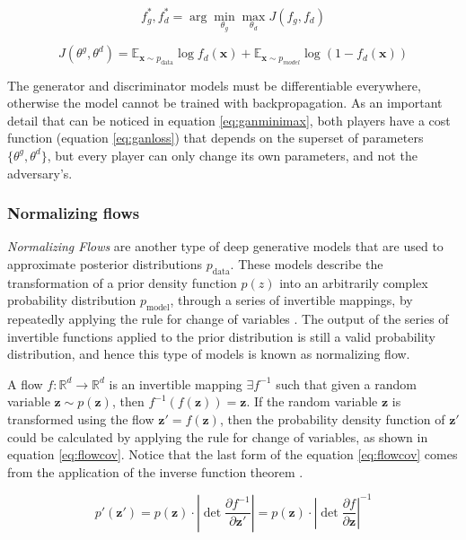 \begin{equation}
	\label{eq:ganminimax}
	f_g^*, f_d^* = \arg \min_{\theta_g} \max_{\theta_d} J(f_g, f_d)
\end{equation}

\begin{equation}
	\label{eq:ganloss}
	J(\theta^g, \theta^d) = \mathbb{E}_{\mathbf{x}\sim p_\mathrm{data}} \log f_d(\mathbf{x}) + \mathbb{E}_{\mathbf{x}\sim p_{model}} \log (1 - f_d(\mathbf{x}))
\end{equation}

The generator and discriminator models must be differentiable everywhere, otherwise the model cannot be trained with backpropagation. As an important detail that can be noticed in equation \ref{eq:ganminimax}, both players have a cost function (equation \ref{eq:ganloss}) that depends on the superset  of parameters $\{\theta^g, \theta^d\}$, but every player can only change its own parameters, and not the adversary's.



\subsubsection{Normalizing flows}
\textit{Normalizing Flows} are another type of deep generative models that are used to approximate posterior distributions $p_\mathrm{data}$. These models describe the transformation of a prior density function $p(z)$ into an arbitrarily complex probability distribution $p_\mathrm{model}$, through a series of invertible mappings, by repeatedly applying the rule for change of variables \autocite{rezende2015}. The output of the series of invertible functions applied to the prior distribution is still a valid probability distribution, and hence this type of models is known as normalizing flow.

A flow $f: \mathbb{R}^d \rightarrow \mathbb{R}^d$ is an invertible mapping $\exists f^{-1}$ such that given a random variable $\mathbf{z} \sim p(\mathbf{z})$, then $f^{-1}(f(\mathbf{z})) = \mathbf{z}$. If the random variable $\mathbf{z}$ is transformed using the flow $\mathbf{z'} = f(\mathbf{z})$, then the probability density function of $\mathbf{z'}$ could be calculated by applying the rule for change of variables, as shown in equation \ref{eq:flowcov}. Notice that the last form of the  equation \ref{eq:flowcov} comes from the application of the inverse function theorem \autocite{rezende2015}.

\begin{equation}
\label{eq:flowcov}
p'(\mathbf{z'}) = p(\mathbf{z}) \cdot \left| \det \frac{\partial f^{-1}}{\partial \mathbf{z'}} \right| = p(\mathbf{z}) \cdot \left| \det \frac{\partial f}{\partial \mathbf{z}} \right|^{-1}
\end{equation}

